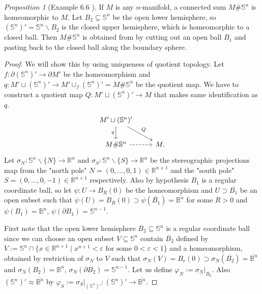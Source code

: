 \documentclass[a4paper]{article}
\theoremstyle{remark}
\newtheorem{prop}{Proposition}
\newcommand{\er}{\mathbb{R}} %
\newcommand{\rn}{\mathbb{R}^n} %
\newcommand{\s}{\mathbb{S}} %
\newcommand{\doo}{\partial}    %
\newcommand{\subhim}{\subseteq} %
\begin{document}
\begin{prop}[Example 6.6 \cite{LeeTM}]
	If $M$ is any $n$-manifold, a connected sum $M \# \mathbb{S}^n$ is homeomorphic to $M$. Let $B_2 \subhim \s^n$ be the open lower hemisphere, so $(\s^n)' = \s^n \smallsetminus B_2$ is the closed upper hemisphere, which is homeomorphic to a closed ball. Then $M \# \s^n$ is obtained from by cutting out an open ball $B_1$ and pasting back to the closed ball along the boundary sphere.
\end{prop}
\begin{proof}
	We will show this by using uniqueness of quotient topology. Let $f : \doo (\s^n)' \to \doo M'$ be the homeomorphism and $q : M' \sqcup (\s^n)' \to M' \cup_f (\s^n)' = M \# \s^n$ be the quotient map. We have to construct a quotient map $Q :  M' \sqcup (\s^n)' \to M$ that makes same identification as $q$. 
	\[
	\begin{tikzcd}
	 M' \sqcup (\s^n)' \arrow[d,"q",swap] \arrow[dr,"Q"] & \\
	M \# \s^n \arrow[r,dashrightarrow] & M.
	\end{tikzcd}
	\]
	Let $\sigma_N : \s^n \smallsetminus \{N\} \to \rn$ and $\sigma_S : \s^n \smallsetminus \{S\} \to \rn$ be the stereographic projections map from the "north pole" $N =(0,\dots,0,1) \in \er^{n+1}$ and the "south pole" $S = (0,\dots,0,-1) \in \er^{n+1}$ respectively. Also by hypothesis $B_1$ is a regular coordinate ball, so let $\psi : U \to B_R(0)$ be the homeomorphism and $U \supset \overline{B_1}$ be an open subset such that $\psi(U) = B_R(0) \supset \psi(\overline{B_1}) = \overline{\mathbb{B}^n}$ for some $R>0$ and $\psi(B_1) = \mathbb{B}^n$, $\psi(\doo B_1) = \s^{n-1}$.
	
	First note that the open lower hemisphere $B_2\subhim \s^n$ is a regular coordinate ball since we can choose an open subset $V \subhim \s^n $ contain $\overline{B_2}$ defined by $V :=\s^n \cap \{x \in \er^{n+1} \mid x^{n+1} < \varepsilon \text{ for some }0 <\varepsilon <1\}$ and a homeomorphism, obtained by restriction of $\sigma_N$ to $V$ such that $\sigma_{N}(V) = B_r(0) \supset \sigma_N(\overline{B_2}) = \overline{\mathbb{B}^n}$ and $\sigma_{N}(B_2) = \mathbb{B}^n$, $\sigma_{N}(\doo B_2) = \s^{n-1}$. Let us define $\varphi_N := \sigma_N|_{\overline{B_2}}$. Also $(\s^n)' \approx \overline{\mathbb{B}^n}$ by $\varphi_S := \sigma_S|_{(\s^n)'} : (\s^n)' \to \overline{\mathbb{B}^n}$.  
	

\end{proof}
\end{document}
